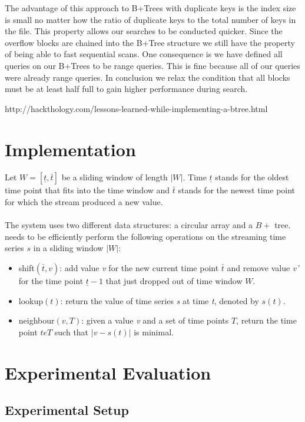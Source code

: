 \documentclass[abstracton,12pt]{scrreprt}
\begin{document}
The advantage of this approach to B+Trees with duplicate keys is the index size is small no matter how the ratio of duplicate keys to the total number of keys in the file. This property allows our searches to be conducted quicker. Since the overflow blocks are chained into the B+Tree structure we still have the property of being able to fast sequential scans. One consequence is we have defined all queries on our B+Trees to be range queries. This is fine because all of our queries were already range queries. In conclusion we relax the condition that all blocks must be at least half full to gain higher performance during search.

http://hackthology.com/lessons-learned-while-implementing-a-btree.html

\chapter{Implementation}
\label{sec:Implementation}


Let $W=[ \underline{t}, \bar{t} ]$ be a sliding window of length $|W|$. Time $\underline{t}$ stands for the oldest time point that fits into the time window and $\bar{t}$ stands for the newest time point for which the stream produced a new value. \\\\The system uses two different data structures: a circular array and a $B+$ tree. needs to be efficiently perform the following operations on the streaming time series $s$ in a sliding window $|W|$: \\
\begin{itemize}  
	\item shift$(\bar{t}, v)$: add value \emph{v} for the new current time point $\bar{t}$ and remove value \emph{v'} for the time point $\underline{t} - 1$ that just dropped out of time window $W$.
	\item lookup$(t)$: return the value of time series \emph{s} at time \emph{t}, denoted by $s(t)$.
	\item neighbour$(v, T)$: given a value \emph{v} and a set of time points $T$, return the time point $t e T$ such that $|v-s(t)|$ is minimal.\\
\end{itemize}


\chapter{Experimental Evaluation}
\label{sec:Experimental}
\section{Experimental Setup}
\end{document}
